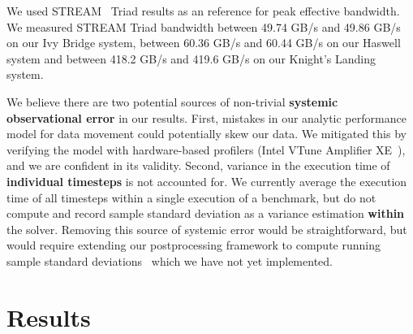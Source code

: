 \documentclass[10pt, conference, compsocconf]{IEEEtran}
\begin{document}
We used STREAM~\cite{stream} Triad results as an reference for peak effective
  bandwidth.
We measured STREAM Triad bandwidth between 49.74 GB/s and 49.86 GB/s on our Ivy
  Bridge system, between 60.36 GB/s and 60.44 GB/s on our Haswell system and
  between 418.2 GB/s and 419.6 GB/s on our Knight's Landing system.

We believe there are two potential sources of non-trivial \textbf{systemic
  observational error} in our results.
First, mistakes in our analytic performance model for data movement could
  potentially skew our data.
We mitigated this by verifying the model with hardware-based
  profilers (Intel VTune Amplifier XE~\cite{intel_vtune_amplifier}), and we are
  confident in its validity.
Second, variance in the execution time of \textbf{individual timesteps} is not
  accounted for.
We currently average the execution time of all timesteps
  within a single execution of a benchmark, but do not compute and record
  sample standard deviation as a variance estimation \textbf{within} the solver.
Removing this source of systemic error would be straightforward, but
  would require extending our postprocessing framework to compute running 
  sample standard deviations~\cite{benchmarking_cxx_code} which we have not
  yet implemented.

\section{Results}
\label{sec:results}
\end{document}
